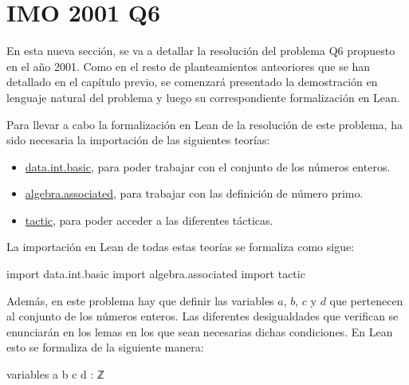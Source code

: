 \section{IMO 2001 Q6}

En esta nueva sección, se va a detallar la resolución del problema Q6
propuesto en el año 2001. Como en el resto de planteamientos anteoriores
que se han detallado en el capítulo previo, se comenzará presentado la
demostración en lenguaje natural del problema y luego su correspondiente
formalización en Lean.

\noindent
{}

Para llevar a cabo la formalización en Lean de la resolución de este
problema, ha sido necesaria la importación de las siguientes teorías:
\begin{itemize}
\item
  \href{https://github.com/leanprover-community/mathlib/blob/master/src/data/int/basic.lean}{data.int.basic},
  para poder trabajar con el conjunto de los números enteros.
\item
  \href{https://github.com/leanprover-community/mathlib/blob/master/src/algebra/associated.lean}{algebra.associated},
  para trabajar con las definición de número primo.
\item
  \href{https://github.com/leanprover-community/mathlib/tree/master/src/tactic}{tactic},
  para poder acceder a las diferentes tácticas.
\end{itemize}

La importación en Lean de todas estas teorías se formaliza como sigue:
\begin{leancode}
import data.int.basic
import algebra.associated
import tactic
\end{leancode}

Además, en este problema hay que definir las variables \(a\), \(b\),
\(c\) y \(d\) que pertenecen al conjunto de los números enteros. Las
diferentes desigualdades que verifican se enunciarán en los lemas en los
que sean necesarias dichas condiciones. En Lean esto se formaliza de la
siguiente manera:
\begin{leancode}
variables {a b c d : ℤ}
\end{leancode}

